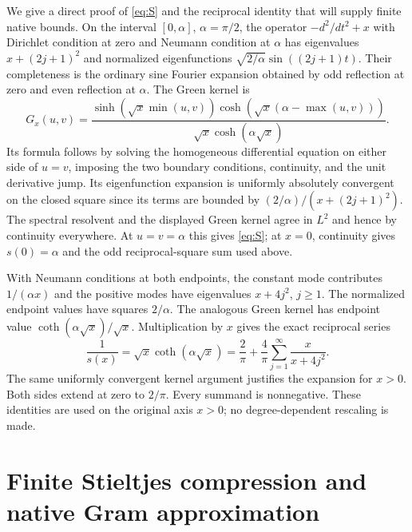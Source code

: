 \documentclass[11pt]{article}
\begin{document}
We give a direct proof of \eqref{eq:S} and the reciprocal identity
that will supply finite native bounds. On the interval
$[0,\alpha]$, $\alpha=\pi/2$, the operator $-d^2/dt^2+x$ with
Dirichlet condition at zero and Neumann condition at $\alpha$
has eigenvalues $x+(2j+1)^2$ and normalized eigenfunctions
$\sqrt{2/\alpha}\sin((2j+1)t)$. Their completeness is the ordinary
sine Fourier expansion obtained by odd reflection at zero and
even reflection at $\alpha$. The Green kernel is
\[
 G_x(u,v)=\frac{\sinh(\sqrt x\min(u,v))
                  \cosh(\sqrt x(\alpha-\max(u,v)))}
                    {\sqrt x\cosh(\alpha\sqrt x)}.
\]
Its formula follows by solving the homogeneous differential
equation on either side of $u=v$, imposing the two boundary
conditions, continuity, and the unit derivative jump. Its
eigenfunction expansion is uniformly absolutely convergent on
the closed square since its terms are bounded by
$(2/\alpha)/(x+(2j+1)^2)$. The spectral resolvent and the displayed
Green kernel agree in $L^2$ and hence by continuity everywhere.
At $u=v=\alpha$ this gives \eqref{eq:S}; at $x=0$, continuity
gives $s(0)=\alpha$ and the odd reciprocal-square sum used above.

With Neumann conditions at both endpoints, the constant mode
contributes $1/(\alpha x)$ and the positive modes have
eigenvalues $x+4j^2$, $j\geq1$. The normalized endpoint values
have squares $2/\alpha$. The analogous Green kernel has endpoint
value $\coth(\alpha\sqrt x)/\sqrt x$. Multiplication by $x$ gives
the exact reciprocal series
\begin{equation}\label{eq:reciprocal}
 \boxed{\frac1{s(x)}=\sqrt x\coth(\alpha\sqrt x)
  =\frac2\pi+\frac4\pi\sum_{j=1}^{\infty}\frac{x}{x+4j^2}.}
\end{equation}
The same uniformly convergent kernel argument justifies the
expansion for $x>0$. Both sides extend at zero to $2/\pi$.
Every summand is nonnegative. These identities are used on the
original axis $x>0$; no degree-dependent rescaling is made.

\section{Finite Stieltjes compression and native Gram approximation}
\end{document}
